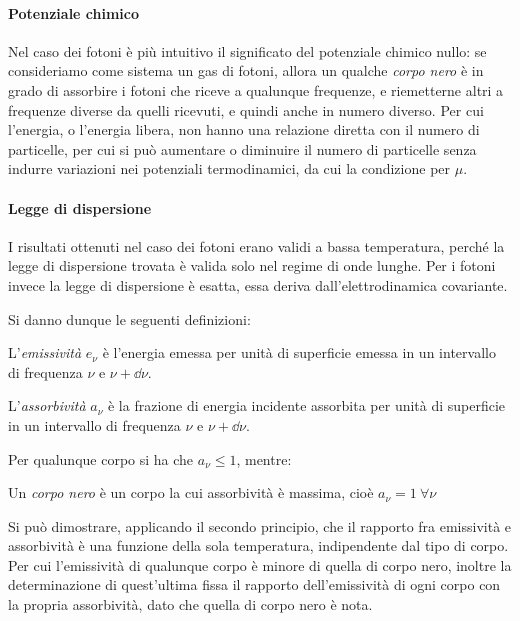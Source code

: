 \paragraph{Potenziale chimico} Nel caso dei fotoni è più intuitivo il significato del potenziale chimico nullo: se consideriamo come sistema un gas di fotoni, allora un qualche \textit{corpo nero} è in grado di assorbire i fotoni che riceve a qualunque frequenze, e riemetterne altri a frequenze diverse da quelli ricevuti, e quindi anche in numero diverso. Per cui l'energia, o l'energia libera, non hanno una relazione diretta con il numero di particelle, per cui si può aumentare o diminuire il numero di particelle senza indurre variazioni nei potenziali termodinamici, da cui la condizione per $ \mu $.

\paragraph{Legge di dispersione} I risultati ottenuti nel caso dei fotoni erano validi a bassa temperatura, perché la legge di dispersione trovata è valida solo nel regime di onde lunghe. Per i fotoni invece la legge di dispersione è esatta, essa deriva dall'elettrodinamica covariante.
\newline

Si danno dunque le seguenti definizioni:

\begin{defn}[Emissività]
	L'\textit{emissività} $ e_\nu $ è l'energia emessa per unità di superficie emessa in un intervallo di frequenza $ \nu $ e $ \nu + \dd \nu $.
\end{defn}

\begin{defn}[Assorbività]
	L'\textit{assorbività} $ a_\nu $ è la frazione di energia incidente assorbita per unità di superficie in un intervallo di frequenza $ \nu $ e $ \nu + \dd \nu $.
\end{defn}

Per qualunque corpo si ha che $ a_\nu \leq 1 $, mentre:

\begin{defn}
	Un \textit{corpo nero} è un corpo la cui assorbività è massima, cioè $ a_\nu = 1~ \forall \nu $
\end{defn}

Si può dimostrare, applicando il secondo principio, che il rapporto fra emissività e assorbività è una funzione della sola temperatura, indipendente dal tipo di corpo.
Per cui l'emissività di qualunque corpo è minore di quella di corpo nero, inoltre la determinazione di quest'ultima fissa il rapporto dell'emissività di ogni corpo con la propria assorbività, dato che quella di corpo nero è nota.

